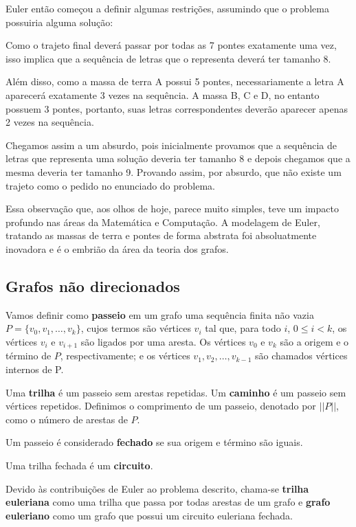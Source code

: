 \documentclass[12pt, a4paper]{article}
\begin{document}
Euler então começou a definir algumas restrições, assumindo que o problema possuiria alguma solução:

Como o trajeto final deverá passar por todas as 7 pontes exatamente uma vez, isso implica que a sequência de letras que o representa deverá ter tamanho 8.

Além disso, como a massa de terra A possui 5 pontes, necessariamente a letra A aparecerá exatamente 3 vezes na sequência.
A massa B, C e D, no entanto possuem 3 pontes, portanto, suas letras correspondentes deverão aparecer apenas 2 vezes na sequência. 

Chegamos assim a um absurdo, pois inicialmente provamos que a sequência de letras que representa uma solução deveria ter tamanho 8 e depois chegamos que a mesma deveria ter tamanho 9.
Provando assim, por absurdo, que não existe um trajeto como o pedido no enunciado do problema.


Essa observação que, aos olhos de hoje, parece muito simples, teve um impacto profundo nas áreas da Matemática e Computação.
A modelagem de Euler, tratando as massas de terra e pontes de forma abstrata foi absoluatmente inovadora e é o embrião da área da teoria dos grafos.


\subsection{Grafos não direcionados}

Vamos definir como \textbf{passeio} em um grafo uma sequência finita não vazia $P = \{ v_0, v_1, \dots, v_k\}$, cujos termos são vértices $v_i$ tal que, para todo $i$, $0 \leq i < k$, os vértices $v_{i}$ e $v_{i+1}$ são ligados por uma aresta. 
Os vértices $v_0$ e $v_k$ são a origem e o término de $P$, respectivamente; e os vértices $v_1, v_2, \dots, v_{k-1}$ são chamados vértices internos de P. 

Uma \textbf{trilha} é um passeio sem arestas repetidas. 
Um \textbf{caminho} é um passeio sem vértices repetidos.
Definimos o comprimento de um passeio, denotado por $||P||$, como o número de arestas de $P$.

Um passeio é considerado \textbf{fechado} se sua origem e término são iguais.

Uma trilha fechada é um \textbf{circuito}.

Devido às contribuições de Euler ao problema descrito, chama-se \textbf{trilha euleriana} como uma trilha que passa por todas arestas de um grafo e \textbf{grafo euleriano} como um grafo que possui um circuito euleriana fechada.
\end{document}

